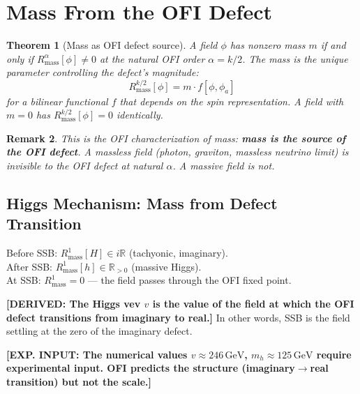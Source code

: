 \documentclass[12pt]{article}
\newtheorem{theorem}{Theorem}[section]
\newtheorem{remark}[theorem]{Remark}
\theoremstyle{definition}
\newcommand{\R}{\mathbb{R}}
\newcommand{\DERIVED}[1]{\textcolor{derivedcolor}{\textbf{[DERIVED: #1]}}}
\newcommand{\INPUT}[1]{\textcolor{inputcolor}{\textbf{[EXP. INPUT: #1]}}}
\begin{document}
\section{Mass From the OFI Defect}
\label{sec:mass}

\begin{theorem}[Mass as OFI defect source]
\label{thm:mass}
A field $\phi$ has nonzero mass $m$ if and only if $R^\alpha_{\mathrm{mass}}[\phi] \neq 0$
at the natural OFI order $\alpha = k/2$.  The mass is the unique parameter
controlling the defect's magnitude:
\begin{equation}
  R^{k/2}_{\mathrm{mass}}[\phi]
  = m \cdot f[\phi, \phi_a]
\end{equation}
for a bilinear functional $f$ that depends on the spin representation.
A field with $m=0$ has $R^{k/2}_{\mathrm{mass}}[\phi]=0$ identically.
\end{theorem}

\begin{remark}
This is the OFI characterization of mass: \textbf{mass is the source of the
OFI defect}.  A massless field (photon, graviton, massless neutrino limit)
is invisible to the OFI defect at natural $\alpha$.  A massive field is
not.
\end{remark}

\subsection{Higgs Mechanism: Mass from Defect Transition}

Before SSB: $R^1_{\mathrm{mass}}[H] \in i\R$ (tachyonic, imaginary).\\
After SSB: $R^1_{\mathrm{mass}}[h] \in \R_{>0}$ (massive Higgs).\\
At SSB: $R^1_{\mathrm{mass}} = 0$ — the field passes through the OFI
fixed point.

\DERIVED{The Higgs vev $v$ is the value of the field at which the OFI
defect transitions from imaginary to real.}  In other words, SSB is
the field settling at the zero of the imaginary defect.

\INPUT{The numerical values $v \approx 246\,\mathrm{GeV}$,
$m_h \approx 125\,\mathrm{GeV}$ require experimental input.  OFI
predicts the structure (imaginary$\to$real transition) but not the scale.}

\end{document}
